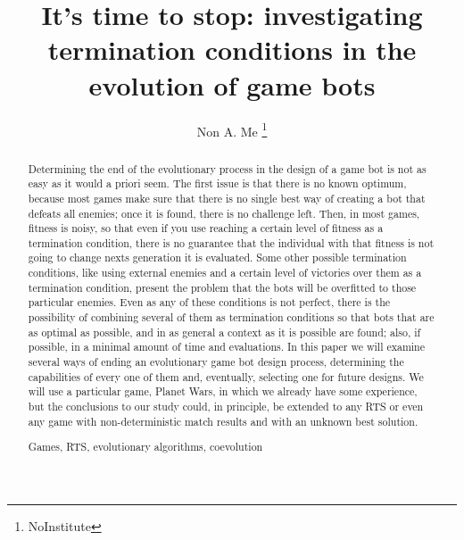 \documentclass[runningheads,a4paper]{llncs}
\newcommand{\keywords}[1]{\par\addvspace\baselineskip
\noindent\keywordname\enspace\ignorespaces#1}
\begin{document}
\mainmatter  %

\title{It's time to stop: investigating termination conditions in the evolution of game bots}


%
%
\author{Non A. Me%
\thanks{NoInstitute}}
%


%
%

\maketitle


\begin{abstract}
Determining the end of the evolutionary process in the design of a
game bot is not as easy as it would a priori seem. The first issue is
that there is no known optimum, because most games make sure that there is
no single best way of creating a bot that defeats all enemies; once it
is found, there is no challenge left. Then, in
most games, fitness is noisy, so that even if you use reaching a certain level
of fitness as a termination condition, there is no guarantee that the
individual with that fitness is not going to change nexts
generation it is evaluated. Some other possible termination
conditions,  like using external enemies and a
certain level of victories over them as a termination condition,
present the problem that the bots will be overfitted to
those particular enemies. Even as any of these conditions is not
perfect, there is the possibility of combining several of them as
termination conditions so that bots that are as optimal as possible,
and in as general a context as it is possible are found; also, if 
possible, in a minimal amount of time and evaluations. In this paper
we will examine several ways of ending an evolutionary
game bot design process, determining the capabilities of every one of
them and, eventually, selecting one for future designs. We will use a particular
game, Planet Wars, in which we already have some experience, but the
conclusions to our study could, in principle, be extended to any RTS
or even any game with non-deterministic match results and with an
unknown best solution.
\keywords{Games, RTS, evolutionary algorithms, coevolution}
\end{abstract}
\end{document}
